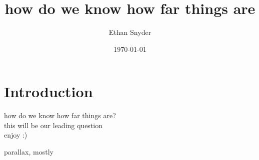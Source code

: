 \documentclass[12pt]{beamer}
\title{how do we know how far things are}
\author{Ethan Snyder}
\date{\today}
\begin{document}

\begin{frame}
    \titlepage
\end{frame}

\section{Introduction}

    \begin{frame}
        \centering
        \large how do we know how far things are?\\
        \vspace{2em}
        \normalsize this will be our leading question\\
        \vspace{2em}
        enjoy :)
    \end{frame}
    \begin{frame}
        \centering
        parallax, mostly
    \end{frame}
\end{document}
